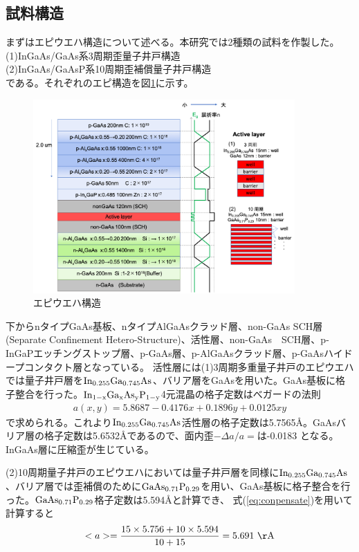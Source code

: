 \subsection{試料構造}%
まずはエピウエハ構造について述べる。本研究では2種類の試料を作製した。\\
(1)InGaAs/GaAs系3周期歪量子井戸構造\\
(2)InGaAs/GaAsP系10周期歪補償量子井戸構造\\
である。それぞれのエピ構造を図\ref{fig:fig_2_1_wafer_structure}に示す。
\begin{figure}[h]
	\centering
	\includegraphics[width=10cm]{figure/fig_2_1_wafer_structure.png}
	\caption{エピウエハ構造}
	\label{fig:fig_2_1_wafer_structure}
\end{figure}
下からnタイプGaAs基板、nタイプAlGaAsクラッド層、non-GaAs SCH層(Separate Confinement Hetero-Structure)、活性層、non-GaAs　SCH層、p-InGaPエッチングストップ層、p-GaAs層、p-AlGaAsクラッド層、p-GaAsハイドープコンタクト層となっている。
活性層には(1)3周期多重量子井戸のエピウエハでは量子井戸層を$\rm{In_{0.255}Ga_{0.745}As}$、バリア層をGaAsを用いた。GaAs基板に格子整合を行った。$\rm{In_{1-x}Ga_{x}As_{y}P_{1-y}}$4元混晶の格子定数はべガードの法則
\begin{eqnarray}
a(x,y)=5.8687-0.4176x+0.1896y+0.0125xy
\end{eqnarray}
で求められる\cite{ref_iga}。これより$\rm{In_{0.255}Ga_{0.745}As}$活性層の格子定数は5.7565\AA 。GaAsバリア層の格子定数は5.6532\AA であるので、面内歪$-\Delta a/a=$は-0.0183 となる。InGaAs層に圧縮歪が生じている。

(2)10周期量子井戸のエピウエハにおいては量子井戸層を同様に$\rm{In_{0.255}Ga_{0.745}As}$、バリア層では歪補償のために$\rm{GaAs_{0.71}P_{0.29}}$を用い、GaAs基板に格子整合を行った。$\rm{GaAs_{0.71}P_{0.29}}$格子定数は5.594\AA と計算でき、
式(\ref{eq:conpensate})を用いて計算すると
\begin{eqnarray}
<a>=\dfrac{15 \times 5.756+10\times 5.594 }{10+15}=5.691\  \rm{\AA}
\end{eqnarray}

